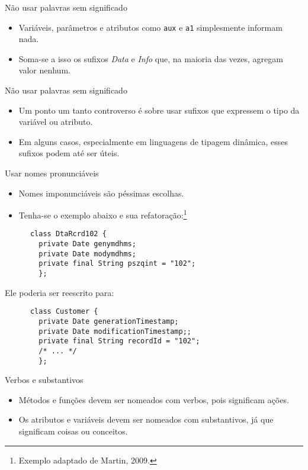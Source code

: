 \documentclass[11pt]{beamer}
\begin{document}
  \begin{frame}[fragile]{Não usar palavras sem significado}
    \begin{itemize}
      \item Variáveis, parâmetros e atributos como \verb|aux| e \verb|a1| simplesmente informam nada.
      \item Soma-se a isso os sufixos \textit{Data} e \textit{Info} que, na maioria das vezes, agregam valor nenhum.
    \end{itemize}
  \end{frame}

  \begin{frame}{Não usar palavras sem significado}
    \begin{itemize}
      \item Um ponto um tanto controverso é sobre usar sufixos que expressem o tipo da variável ou atributo.
      \item Em alguns casos, especialmente em linguagens de tipagem dinâmica, esses sufixos podem até ser úteis.
    \end{itemize}
  \end{frame}

  \begin{frame}[fragile]{Usar nomes pronunciáveis}
    \begin{itemize}
      \item Nomes imponunciáveis são péssimas escolhas.
      \item Tenha-se o exemplo abaixo e sua refatoração:\footnote{Exemplo adaptado de Martin, 2009.}
    \end{itemize}

    \begin{lstlisting}
      class DtaRcrd102 {
        private Date genymdhms;
        private Date modymdhms;
        private final String pszqint = "102";
        };
    \end{lstlisting}
  
    Ele poderia ser reescrito para:
   
    \begin{lstlisting}
      class Customer {
        private Date generationTimestamp;
        private Date modificationTimestamp;;
        private final String recordId = "102";
        /* ... */
        };
    \end{lstlisting}
  \end{frame}

  \begin{frame}{Verbos e substantivos}
    \begin{itemize}
      \item Métodos e funções devem ser nomeados com verbos, pois significam ações.
      \item Os atributos e variáveis devem ser nomeados com substantivos, já que significam coisas ou conceitos.
    \end{itemize}
  \end{frame}
\end{document}
